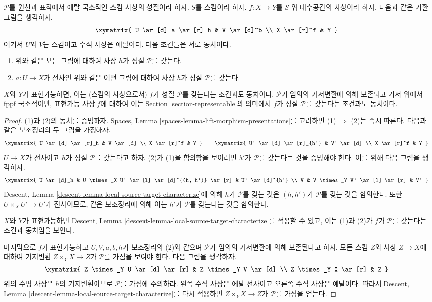 \begin{lemma}
\label{lemma-local-source-target}
$\mathcal{P}$를 원천과 표적에서 에탈 국소적인 스킴 사상의 성질이라
하자. $S$를 스킴이라 하자.
$f : X \to Y$를 $S$ 위 대수공간의 사상이라 하자.
다음과 같은 가환 그림을 생각하자.
$$
\xymatrix{
U \ar[d]_a \ar[r]_h & V \ar[d]^b \\
X \ar[r]^f & Y
}
$$
여기서 $U$와 $V$는 스킴이고 수직 사상은 에탈이다.
다음 조건들은 서로 동치이다.
\begin{enumerate}
\item 위와 같은 모든 그림에 대하여 사상 $h$가 성질
$\mathcal{P}$를 갖는다.
\item $a : U \to X$가 전사인 위와 같은 어떤 그림에 대하여
사상 $h$가 성질 $\mathcal{P}$를 갖는다.
\end{enumerate}
$X$와 $Y$가 표현가능하면, 이는 (스킴의 사상으로서) $f$가
성질 $\mathcal{P}$를 갖는다는 조건과도 동치이다.
$\mathcal{P}$가 임의의 기저변환에 의해 보존되고 기저 위에서
fppf 국소적이면, 표현가능 사상 $f$에 대하여 이는
Section \ref{section-representable}의 의미에서 $f$가 성질
$\mathcal{P}$를 갖는다는 조건과도 동치이다.
\end{lemma}

\begin{proof}
(1)과 (2)의 동치를 증명하자.
Spaces, Lemma \ref{spaces-lemma-lift-morphism-presentations}를
고려하면 (1) $\Rightarrow$ (2)는 즉시 따른다.
다음과 같은 보조정리의 두 그림을 가정하자.
$$
\xymatrix{
U \ar[d] \ar[r]_h & V \ar[d] \\
X \ar[r]^f & Y
}
\quad\quad
\xymatrix{
U' \ar[d] \ar[r]_{h'} & V' \ar[d] \\
X \ar[r]^f & Y
}
$$
$U \to X$가 전사이고 $h$가 성질 $\mathcal{P}$를 갖는다고 하자.
(2)가 (1)을 함의함을 보이려면 $h'$가 $\mathcal{P}$를 갖는다는 것을
증명해야 한다. 이를 위해 다음 그림을 생각하자.
$$
\xymatrix{
U \ar[d]_h &
U \times_X U' \ar[l] \ar[d]^{(h, h')} \ar[r] &
U' \ar[d]^{h'} \\
V &
V \times_Y V' \ar[l] \ar[r] &
V'
}
$$
Descent, Lemma \ref{descent-lemma-local-source-target-characterize}에
의해 $h$가 $\mathcal{P}$를 갖는 것은 $(h, h')$가 $\mathcal{P}$를
갖는 것을 함의한다. 또한 $U \times_X U' \to U'$가 전사이므로,
같은 보조정리에 의해 이는 $h'$가 $\mathcal{P}$를 갖는다는 것을
함의한다.

\medskip\noindent
$X$와 $Y$가 표현가능하면 Descent, Lemma
\ref{descent-lemma-local-source-target-characterize}를 적용할 수
있고, 이는 (1)과 (2)가 $f$가 $\mathcal{P}$를 갖는다는 조건과
동치임을 보인다.

\medskip\noindent
마지막으로 $f$가 표현가능하고 $U, V, a, b, h$가
보조정리의 (2)와 같으며 $\mathcal{P}$가 임의의 기저변환에 의해
보존된다고 하자. 모든 스킴 $Z$와 사상 $Z \to X$에 대하여
기저변환 $Z \times_Y X \to Z$가 $\mathcal{P}$를 가짐을 보여야 한다.
다음 그림을 생각하자.
$$
\xymatrix{
Z \times_Y U \ar[d] \ar[r] &
Z \times_Y V \ar[d] \\
Z \times_Y X \ar[r] &
Z
}
$$
위의 수평 사상은 $h$의 기저변환이므로 $\mathcal{P}$를 가짐에
주의하라. 왼쪽 수직 사상은 에탈 전사이고 오른쪽 수직 사상은
에탈이다. 따라서 Descent, Lemma
\ref{descent-lemma-local-source-target-characterize}를 다시 적용하면
$Z \times_Y X \to Z$가 $\mathcal{P}$를 가짐을 얻는다.
\end{proof}

